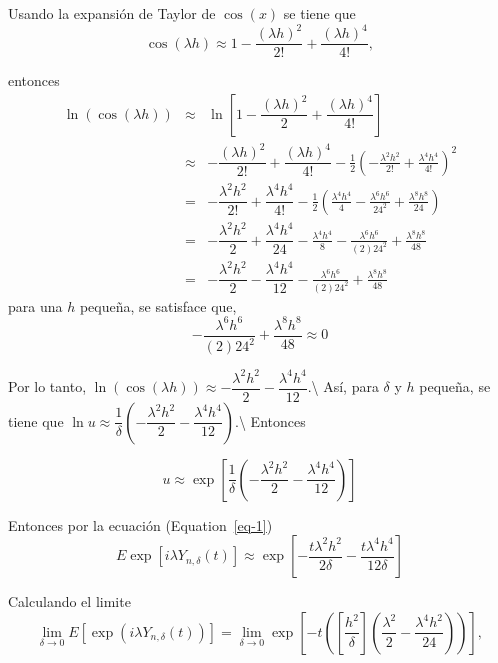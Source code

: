 \documentclass[
  letterpaper,
  DIV=11,
  numbers=noendperiod]{scrreprt}
\theoremstyle{definition}
\theoremstyle{plain}
\theoremstyle{remark}
\begin{document}
Usando la expansión de Taylor de \(\cos\left(x\right)\) se tiene que \[
\cos\left(\lambda h\right)\approx1-\dfrac{\left(\lambda h\right)^{2}}{2!}+\dfrac{\left(\lambda h\right)^{4}}{4!},
\]

entonces \begin{eqnarray}
    \ln\left(\cos\left(\lambda h\right)\right) & \approx & \ln\left[1-\dfrac{\left(\lambda h\right)^{2}}{2}+\dfrac{\left(\lambda h\right)^{4}}{4!}\right]\nonumber\\
 & \approx & -\dfrac{\left(\lambda h\right)^{2}}{2!}+\dfrac{\left(\lambda h\right)^{4}}{4!}-\frac{1}{2}\left(-\frac{\lambda^{2}h^{2}}{2!}+\frac{\lambda^{4}h^{4}}{4!}\right)^{2}\nonumber\\
  & = & -\dfrac{\lambda^{2} h^{2}}{2!}+\dfrac{\lambda ^{4}h^{4}}{4!}-\frac{1}{2}\left(\frac{\lambda^{4}h^{4}}{4}-\frac{\lambda^{6}h^{6}}{24^{2}}+\frac{\lambda^{8}h^{8}}{24}\right)\nonumber\\
   & = & -\dfrac{\lambda^{2} h^{2}}{2}+\dfrac{\lambda^{4} h^{4}}{24}-\frac{\lambda^{4}h^{4}}{8}-\frac{\lambda^{6}h^{6}}{(2)24^{2}}+\frac{\lambda^{8}h^{8}}{48}\nonumber\\
   & = & -\dfrac{\lambda^{2} h^{2}}{2}-\dfrac{\lambda^{4} h^{4}}{12}-\frac{\lambda^{6}h^{6}}{(2)24^{2}}+\frac{\lambda^{8}h^{8}}{48}
\end{eqnarray} para una \(h\) pequeña, se satisface que, \[
-\frac{\lambda^{6}h^{6}}{(2)24^{2}}+\frac{\lambda^{8}h^{8}}{48}\approx 0
\]

Por lo tanto,
\(\ln\left(\cos\left(\lambda h\right)\right)\approx -\dfrac{\lambda^{2} h^{2}}{2}-\dfrac{\lambda^{4} h^{4}}{12}\).\textbackslash{}
Así, para \(\delta\) y \(h\) pequeña, se tiene que
\(\ln u\approx \dfrac{1}{\delta}\left(-\dfrac{\lambda^{2} h^{2}}{2}-\dfrac{\lambda^{4} h^{4}}{12}\right)\).\textbackslash{}
Entonces

\begin{equation}
    u\approx\exp\left[\dfrac{1}{\delta}\left(-\dfrac{\lambda^{2} h^{2}}{2}-\dfrac{\lambda^{4} h^{4}}{12}\right)\right]
\end{equation}

Entonces por la ecuación (Equation~\ref{eq-1}) \begin{equation}
    E\exp\left[i\lambda Y_{n,\delta}\left(t\right)\right]\approx\exp\left[-\dfrac{t\lambda^{2} h^{2}}{2\delta}-\dfrac{t\lambda^{4} h^{4}}{12\delta}\right]
\end{equation}

Calculando el limite \[
\lim_{\delta\to0}E\left[\exp\left(i\lambda Y_{n,\delta}\left(t\right)\right)\right]=\lim_{\delta\to0}\exp\left[-t\left(\left[\dfrac{h^{2}}{\delta}\right]\left(\dfrac{\lambda^{2}}{2}-\dfrac{\lambda^{4}h^{2}}{24}\right)\right)\right],
\]
\end{document}
